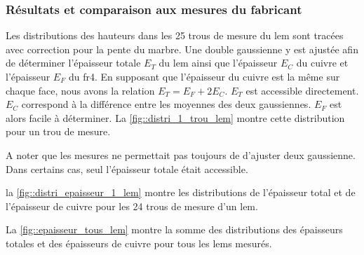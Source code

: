                     
            \subsubsection{Résultats et comparaison aux mesures du fabricant}
                
                Les distributions des hauteurs dans les 25 trous de mesure du \gls{lem} sont tracées avec correction pour la pente du marbre. Une double gaussienne y est ajustée afin de déterminer l'épaisseur totale $E_T$ du \gls{lem} ainsi que l'épaisseur $E_C$ du cuivre et l'épaisseur $E_F$ du \gls{fr4}. En supposant que l'épaisseur du cuivre est la même sur chaque face, nous avons la relation $E_T = E_F + 2E_C$. $E_T$ est accessible directement. $E_C$ correspond à la différence entre les moyennes des deux gaussiennes. $E_F$ est alors facile à déterminer. La \autoref{fig::distri_1_trou_lem} montre cette distribution pour un trou de mesure. 
                
                A noter que les mesures ne permettait pas toujours de d'ajuster deux gaussienne. Dans certains cas, seul l'épaisseur totale était accessible.
                
                la \autoref{fig::distri_epaisseur_1_lem} montre les distributions de l'épaisseur total et de l'épaisseur de cuivre pour les 24 trous de mesure d'un \gls{lem}.
                
                La \autoref{fig::epaisseur_tous_lem} montre la somme des distributions des épaisseurs totales et des épaisseurs de cuivre pour tous les \glspl{lem} mesurés.
                
